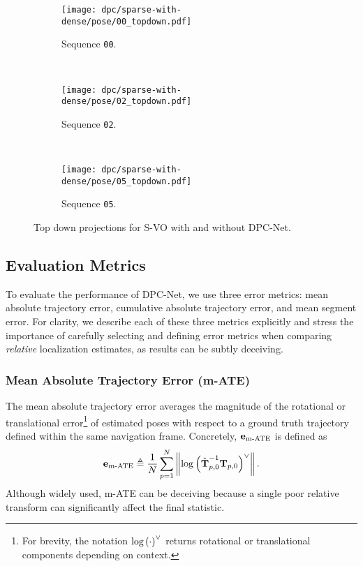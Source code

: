 \begin{figure}
    \centering
    \begin{subfigure}{0.48\textwidth}
        \texttt{[image: dpc/sparse-with-dense/pose/00\_topdown.pdf]}
        \label{00-top-down}
        \caption{Sequence \texttt{00}.}
    \end{subfigure}
    ~
    \begin{subfigure}{0.48\textwidth}
        \texttt{[image: dpc/sparse-with-dense/pose/02\_topdown.pdf]}
        \label{02-top-down}
        \caption{Sequence \texttt{02}.}
    \end{subfigure}
    ~
    \begin{subfigure}{0.48\textwidth}
        \texttt{[image: dpc/sparse-with-dense/pose/05\_topdown.pdf]}
        \label{05-top-down}
        \caption{Sequence \texttt{05}.}
    \end{subfigure}
   \caption{Top down projections for S-VO with and without DPC-Net.}
  \label{fig:top-downs} 
\end{figure}

\subsection{Evaluation Metrics}
To evaluate the performance of DPC-Net, we use three error metrics: mean absolute trajectory error, cumulative absolute trajectory error, and mean segment error. For clarity, we describe each of these three metrics explicitly and stress the importance of carefully selecting and defining error metrics when comparing \textit{relative} localization estimates, as results can be subtly deceiving.

\subsubsection{Mean Absolute Trajectory Error (m-ATE)} The mean absolute trajectory error averages the magnitude of the rotational or translational error\footnote{For brevity, the notation $\mathrm{log}\left({\cdot}\right)^{\vee}$ returns rotational or translational components depending on context.} of estimated poses with respect to a ground truth trajectory defined within the same navigation frame. Concretely, $\boldsymbol{\mathbf{e}}_\text{m-ATE}$ is defined as
\begin{equation}
	\boldsymbol{\mathbf{e}}_\text{m-ATE} \triangleq \frac{1}{N} \sum_{p=1}^{N} \left\Vert\mathrm{log}\left({\hat{\boldsymbol{\mathbf{T}}}^{-1}_{p,0} \boldsymbol{\mathbf{T}}_{p,0}}\right)^{\vee}\right\Vert.
\end{equation}
Although widely used, m-ATE can be deceiving because a single poor relative transform can significantly affect the final statistic.

